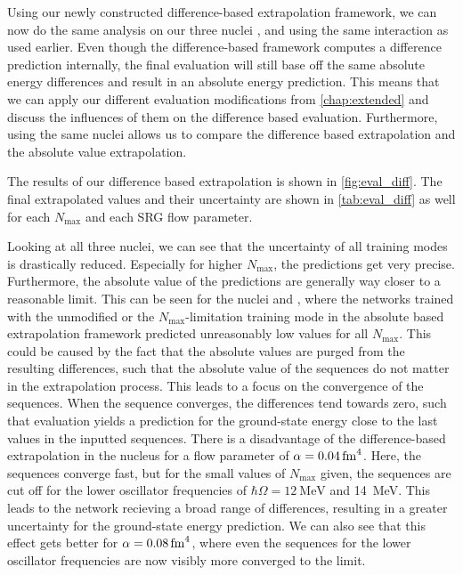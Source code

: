 Using our newly constructed difference-based extrapolation framework, we can now do the same analysis on our three nuclei ,  and  using the same interaction as used earlier. Even though the difference-based framework computes a difference prediction internally, the final evaluation will still base off the same absolute energy differences and result in an absolute energy prediction. This means that we can apply our different evaluation modifications from \autoref{chap:extended} and discuss the influences of them on the difference based evaluation. Furthermore, using the same nuclei allows us to compare the difference based extrapolation and the absolute value extrapolation.

The results of our difference based extrapolation is shown in \autoref{fig:eval_diff}. The final extrapolated values and their uncertainty are shown in \autoref{tab:eval_diff} as well for each $N_\mathrm{max}$ and each SRG flow parameter.

Looking at all three nuclei, we can see that the uncertainty of all training modes is drastically reduced. Especially for higher $N_\mathrm{max}$, the predictions get very precise. Furthermore, the absolute value of the predictions are generally way closer to a reasonable limit. This can be seen for the nuclei  and , where the networks trained with the unmodified or the $N_\mathrm{max}$-limitation training mode in the absolute based extrapolation framework predicted unreasonably low values for all $N_\mathrm{max}$. This could be caused by the fact that the absolute values are purged from the resulting differences, such that the absolute value of the sequences do not matter in the extrapolation process. This leads to a focus on the convergence of the sequences. When the sequence converges, the differences tend towards zero, such that evaluation yields a prediction for the ground-state energy close to the last values in the inputted sequences. There is a disadvantage of the difference-based extrapolation in the nucleus  for a flow parameter of $\alpha = \srg{0.04}$. Here, the sequences converge fast, but for the small values of $N_\mathrm{max}$ given, the sequences are cut off for the lower oscillator frequencies of $\hbar\Omega = \SI{12}{\mega\electronvolt}$ and \SI{14}{\mega\electronvolt}. This leads to the network recieving a broad range of differences, resulting in a greater uncertainty for the ground-state energy prediction. We can also see that this effect gets better for $\alpha = \srg{0.08}$, where even the sequences for the lower oscillator frequencies are now visibly more converged to the limit.

